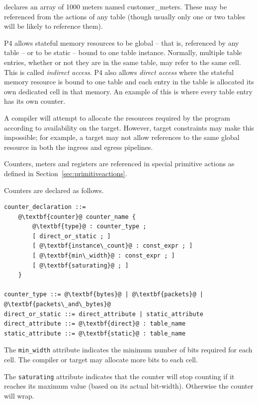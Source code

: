 \documentclass[12pt]{article}
\begin{document}
declares an array of 1000 meters named customer_meters. These may be referenced 
from the actions of any table (though usually only one or two tables will 
be likely to reference them).

P4 allows stateful memory resources to be global -- that is, referenced by 
any table -- or to be static -- bound to one table instance. Normally, multiple 
table entries, whether or not they are in the same table, may refer to the 
same cell. This is called \textit{indirect access}. P4 also allows \textit{direct access} where 
the stateful memory resource is bound to one table and each entry in the table 
is allocated its own dedicated cell in that memory. An example of this is 
where every table entry has its own counter.

A compiler will attempt to allocate the resources required by the program 
according to availability on the target. However, target constraints may make 
this impossible; for example, a target may not allow references to the same 
global resource in both the ingress and egress pipelines.

{\color{red} Counters, meters and registers are referenced in special primitive actions as defined 
in Section~\ref{sec:primitiveactions}.}


Counters are declared as follows.

\begin{lstlisting}[frame=single,backgroundcolor=\color{bnfgreen},escapechar=\@]
counter_declaration ::=
    @\textbf{counter}@ counter_name { 
        @\textbf{type}@ : counter_type ;
        [ direct_or_static ; ]
        [ @\textbf{instance\_count}@ : const_expr ; ]
        [ @\textbf{min\_width}@ : const_expr ; ]
        [ @\textbf{saturating}@ ; ]
    }

counter_type ::= @\textbf{bytes}@ | @\textbf{packets}@ | @\textbf{packets\_and\_bytes}@
direct_or_static ::= direct_attribute | static_attribute
direct_attribute ::= @\textbf{direct}@ : table_name
static_attribute ::= @\textbf{static}@ : table_name
\end{lstlisting}


The \texttt{min_width} attribute indicates the minimum number of bits
required for each cell.  The compiler or target may allocate more bits
to each cell.

The \texttt{saturating} attribute indicates that the counter will stop
counting if it reaches its maximum value (based on its actual
bit-width). Otherwise the counter will wrap.
\end{document}
